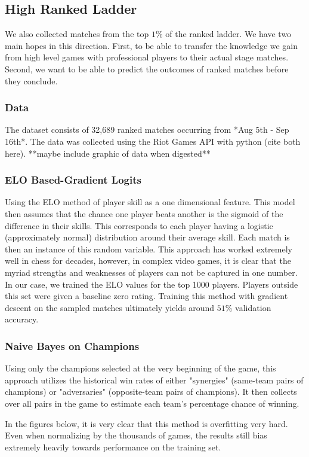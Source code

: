\documentclass{article}
\begin{document}
\subsection{High Ranked Ladder}
We also collected matches from the top $1\%$ of the ranked ladder.
We have two main hopes in this direction.
First, to be able to transfer the knowledge we gain from high level games with professional players to their actual stage matches.
Second, we want to be able to predict the outcomes of ranked matches before they conclude.

\subsubsection{Data}
The dataset consists of 32,689 ranked matches occurring from *Aug 5th - Sep 16th*.
The data was collected using the Riot Games API with python (cite both here).
**maybe include graphic of data when digested**

\subsubsection{ELO Based-Gradient Logits}
Using the ELO method of player skill as a one dimensional feature.
This model then assumes that the chance one player beats another is the sigmoid of the difference in their skills.
This corresponds to each player having a logistic (approximately normal) distribution around their average skill.
Each match is then an instance of this random variable.
This approach has worked extremely well in chess for decades, however, in complex video games, it is clear that the myriad strengths and weaknesses of players can not be captured in one number.
In our case, we trained the ELO values for the top 1000 players.
Players outside this set were given a baseline zero rating.
Training this method with gradient descent on the sampled matches ultimately yields around $51\%$ validation accuracy.

\subsubsection{Naive Bayes on Champions}
Using only the champions selected at the very beginning of the game, this approach utilizes the historical win rates of either "synergies" (same-team pairs of champions) or "adversaries" (opposite-team pairs of champions).
It then collects over all pairs in the game to estimate each team's percentage chance of winning.

In the figures below, it is very clear that this method is overfitting very hard.
Even when normalizing by the thousands of games, the results still bias extremely heavily towards performance on the training set.
\end{document}
